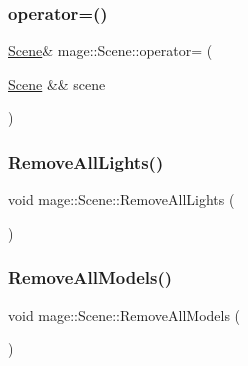 \hypertarget{classmage_1_1_scene_a400926762670c9cd9b6d456291600f53}{}\label{classmage_1_1_scene_a400926762670c9cd9b6d456291600f53} 
\subsubsection{\texorpdfstring{operator=()}{operator=()}\hspace{0.1cm}{\footnotesize\ttfamily [2/2]}}
{\footnotesize\ttfamily \hyperlink{classmage_1_1_scene}{Scene}\& mage\+::\+Scene\+::operator= (\begin{DoxyParamCaption}\item[{\hyperlink{classmage_1_1_scene}{Scene} \&\&}]{scene }\end{DoxyParamCaption})\hspace{0.3cm}{\ttfamily [delete]}}

\hypertarget{classmage_1_1_scene_acde7e343459ea1444f2b0f7bbb3e1882}{}\label{classmage_1_1_scene_acde7e343459ea1444f2b0f7bbb3e1882} 
\subsubsection{\texorpdfstring{Remove\+All\+Lights()}{RemoveAllLights()}}
{\footnotesize\ttfamily void mage\+::\+Scene\+::\+Remove\+All\+Lights (\begin{DoxyParamCaption}{ }\end{DoxyParamCaption})\hspace{0.3cm}{\ttfamily [private]}}

\hypertarget{classmage_1_1_scene_a5dffc6ff3e40981087cbfc2462e5b84a}{}\label{classmage_1_1_scene_a5dffc6ff3e40981087cbfc2462e5b84a} 
\subsubsection{\texorpdfstring{Remove\+All\+Models()}{RemoveAllModels()}}
{\footnotesize\ttfamily void mage\+::\+Scene\+::\+Remove\+All\+Models (\begin{DoxyParamCaption}{ }\end{DoxyParamCaption})\hspace{0.3cm}{\ttfamily [private]}}


